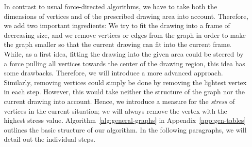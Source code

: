 \documentclass[]{llncs}
\begin{document}
In contrast to usual force-directed algorithms, we have to take both
the dimensions of vertices and of the prescribed drawing area into
account. Therefore,
we add two important ingredients: We try to fit the drawing into a
frame of decreasing size, and we remove vertices or edges from
the graph in order to make the graph smaller so that the current
drawing can fit into the current frame. While, as a first idea,
fitting the drawing into the given area could be steered by a force
pulling all vertices towards the center of the drawing region, this
idea has some drawbacks. Therefore, we will introduce a more advanced
approach. Similarly, removing vertices could simply be done by removing
the lightest vertex in each step. However, this would take neither
the structure of the graph nor the current drawing into account.
Hence, we introduce a measure for the \emph{stress} of vertices in the
current situation; we will always remove the vertex with the highest
stress value. Algorithm~\ref{alg:general-graphs} in
Appendix~\ref{app:gen-tables} outlines the basic structure of our
algorithm. In the following paragraphs, we will detail out the
individual steps.
\end{document}

